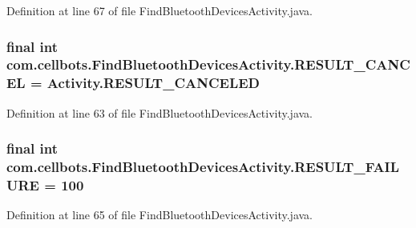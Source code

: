 Definition at line 67 of file Find\-Bluetooth\-Devices\-Activity.\-java.

\hypertarget{classcom_1_1cellbots_1_1_find_bluetooth_devices_activity_a535f4faa23ecba2dd67620609be6f52c}{
\subsubsection[{R\-E\-S\-U\-L\-T\-\_\-\-C\-A\-N\-C\-E\-L}]{\setlength{\rightskip}{0pt plus 5cm}final int {\bf com.\-cellbots.\-Find\-Bluetooth\-Devices\-Activity.\-R\-E\-S\-U\-L\-T\-\_\-\-C\-A\-N\-C\-E\-L} = Activity.\-R\-E\-S\-U\-L\-T\-\_\-\-C\-A\-N\-C\-E\-L\-E\-D}}\label{classcom_1_1cellbots_1_1_find_bluetooth_devices_activity_a535f4faa23ecba2dd67620609be6f52c}


Definition at line 63 of file Find\-Bluetooth\-Devices\-Activity.\-java.

\hypertarget{classcom_1_1cellbots_1_1_find_bluetooth_devices_activity_a3bbfb6974f0bf71c2bb4b7d0ffc946c8}{
\subsubsection[{R\-E\-S\-U\-L\-T\-\_\-\-F\-A\-I\-L\-U\-R\-E}]{\setlength{\rightskip}{0pt plus 5cm}final int {\bf com.\-cellbots.\-Find\-Bluetooth\-Devices\-Activity.\-R\-E\-S\-U\-L\-T\-\_\-\-F\-A\-I\-L\-U\-R\-E} = 100}}\label{classcom_1_1cellbots_1_1_find_bluetooth_devices_activity_a3bbfb6974f0bf71c2bb4b7d0ffc946c8}


Definition at line 65 of file Find\-Bluetooth\-Devices\-Activity.\-java.


